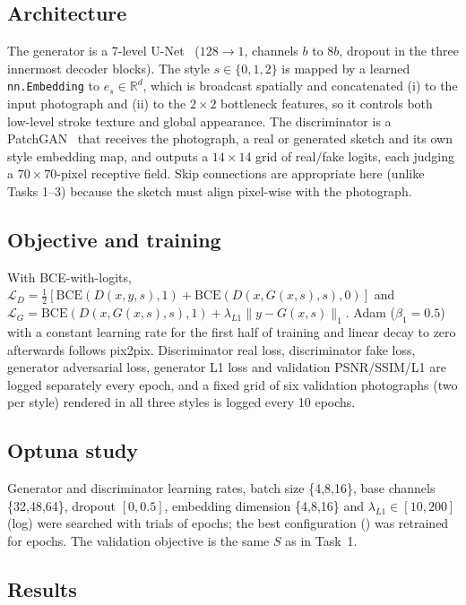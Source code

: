 \documentclass[conference]{IEEEtran}
\begin{document}
\subsection{Architecture}
The generator is a 7-level U-Net~\cite{ronneberger2015,isola2017} ($128\to1$, channels $b$ to $8b$, dropout in the three innermost decoder blocks). The style $s\in\{0,1,2\}$ is mapped by a learned \texttt{nn.Embedding} to $e_s\in\mathbb{R}^{d}$, which is broadcast spatially and concatenated (i) to the input photograph and (ii) to the $2\times2$ bottleneck features, so it controls both low-level stroke texture and global appearance. The discriminator is a PatchGAN~\cite{isola2017} that receives the photograph, a real or generated sketch and its own style embedding map, and outputs a $14\times14$ grid of real/fake logits, each judging a $70\times70$-pixel receptive field. Skip connections are appropriate here (unlike Tasks 1--3) because the sketch must align pixel-wise with the photograph.

\subsection{Objective and training}
With BCE-with-logits, $\mathcal{L}_D=\tfrac12[\text{BCE}(D(x,y,s),1)+\text{BCE}(D(x,G(x,s),s),0)]$ and $\mathcal{L}_G=\text{BCE}(D(x,G(x,s),s),1)+\lambda_{L1}\lVert y-G(x,s)\rVert_1$. Adam ($\beta_1=0.5$) with a constant learning rate for the first half of training and linear decay to zero afterwards follows pix2pix. Discriminator real loss, discriminator fake loss, generator adversarial loss, generator L1 loss and validation PSNR/SSIM/L1 are logged separately every epoch, and a fixed grid of six validation photographs (two per style) rendered in all three styles is logged every 10 epochs.

\subsection{Optuna study}
Generator and discriminator learning rates, batch size \{4,8,16\}, base channels \{32,48,64\}, dropout $[0,0.5]$, embedding dimension \{4,8,16\} and $\lambda_{L1}\in[10,200]$ (log) were searched with \FSTRIALS{} trials of \FSTRIALEP{} epochs; the best configuration (\FSBESTPARAMS) was retrained for \FSEPOCHS{} epochs. The validation objective is the same $S$ as in Task~1.

\subsection{Results}

\end{document}
